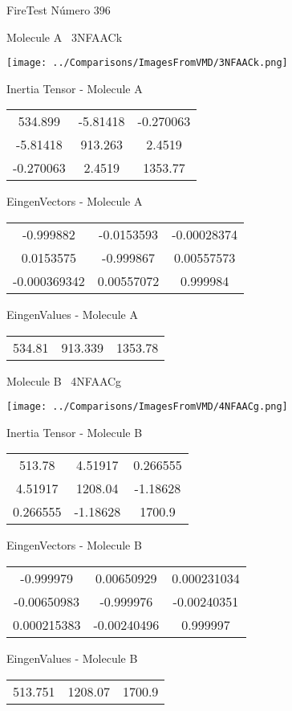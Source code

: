 \vtab[-3cm]
\begin{center}
{\large FireTest \tab Número 396}
\end{center}
\begin{multicols}{2}
\begin{center}

Molecule A \
3NFAACk

\texttt{[image: ../Comparisons/ImagesFromVMD/3NFAACk.png]}

Inertia Tensor - Molecule A \\
\begin{tabular}{|c c c|}
534.899	 & 	-5.81418	 & 	-0.270063	 \\
-5.81418	 & 	913.263	 & 	2.4519	 \\
-0.270063	 & 	2.4519	 & 	1353.77
\end{tabular}

\vtab
 EingenVectors - Molecule A     \\
\begin{tabular}{|c c c|}
-0.999882	 & 	-0.0153593	 & 	-0.00028374	 \\
0.0153575	 & 	-0.999867	 & 	0.00557573	 \\
-0.000369342	 & 	0.00557072	 & 	0.999984
\end{tabular}

\vtab
 EingenValues - Molecule A     \\
\begin{tabular}{|c c c|}
534.81	 & 	913.339	 & 	1353.78	 \\
\end{tabular}
\columnbreak

Molecule B \
4NFAACg

\texttt{[image: ../Comparisons/ImagesFromVMD/4NFAACg.png]}

Inertia Tensor - Molecule B \\
\begin{tabular}{|c c c|}
513.78	 & 	4.51917	 & 	0.266555	 \\
4.51917	 & 	1208.04	 & 	-1.18628	 \\
0.266555	 & 	-1.18628	 & 	1700.9
\end{tabular}

\vtab
 EingenVectors - Molecule B     \\
\begin{tabular}{|c c c|}
-0.999979	 & 	0.00650929	 & 	0.000231034	 \\
-0.00650983	 & 	-0.999976	 & 	-0.00240351	 \\
0.000215383	 & 	-0.00240496	 & 	0.999997
\end{tabular}

\vtab
 EingenValues - Molecule B     \\
\begin{tabular}{|c c c|}
513.751	 & 	1208.07	 & 	1700.9	 \\
\end{tabular}

\end{center}
\end{multicols}


